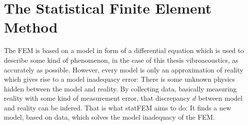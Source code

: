 \documentclass[%
  a4paper,oneside,%
  11pt,%
  smallchapters,
  style=printdev,
  extramargin,
  green,%
  rgb, <cmyk>
  ]{tubsbook}
\begin{document}
\section{The Statistical Finite Element Method}
The FEM is based on a model in form of a differential equation which is used to describe some kind of phenomenon, in the case of this thesis vibroacoustics, as accurately as possible. However, every model is only an approximation of reality which gives rise to a model inadequacy error: There is some unknown physics hidden between the model and reality. By collecting data, basically measuring reality with some kind of measurement error, that discrepancy $d$ between model and reality can be infered. That is what statFEM aims to do: It finds a new model, based on data, which solves the model inadequacy of the FEM.
\end{document}
